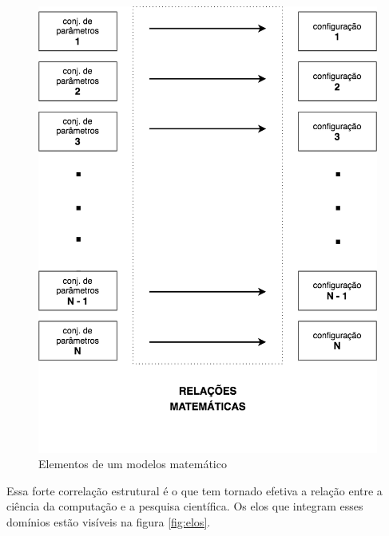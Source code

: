 \begin{figure}[!htb]
	\caption{Elementos de um modelos matemático}\label{fig:modelo_matematico}
	\begin{center}
		\includegraphics[scale=0.50]{imagens/modelo_matematico}
	\end{center}
\end{figure}

Essa forte correlação estrutural é o que tem tornado efetiva a relação entre a ciência da computação e a pesquisa científica. Os elos que integram esses domínios estão visíveis na figura \ref{fig:elos}. 


